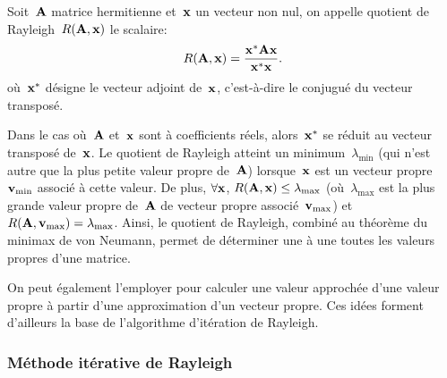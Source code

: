 \begin{definition}
Soit~$\MM{A}$ matrice hermitienne et~$\VV{x}$ un vecteur non nul, on appelle quotient de Rayleigh~$R(\MM{A},\VV{x})$ le scalaire:
\begin{equation}
  R(\MM{A},\VV{x}) = \frac{\VV{x}^{*} \MM{A} \VV{x}}{\VV{x}^{*}\VV{x}}.
\end{equation}
où~$\VV{x}^{*}$ désigne le vecteur adjoint de~$\VV{x}$, c'est-à-dire le conjugué du vecteur transposé.
\end{definition}

Dans le cas où~$\MM{A}$ et~$\VV{x}$ sont à coefficients réels, alors~$\VV{x}^{*}$ se réduit au vecteur transposé de~$\VV{x}$.
\medskipvm
Le quotient de Rayleigh atteint un minimum~$\lambda_{\min}$ (qui n'est autre que la plus petite valeur propre de~$\MM{A}$) lorsque~$\VV{x}$ est un vecteur propre~$\VV{v}_{\min}$ associé à cette valeur.
\medskipvm
De plus, $\forall \VV{x}$, $R(\MM{A}, \VV{x}) \leq \lambda_{\max}$ (où~$\lambda_{\max}$ est la plus grande valeur propre de~$\MM{A}$ de vecteur propre associé~$\VV{v}_{\max}$) et~$R(\MM{A}, \VV{v}_{\max}) = \lambda_{\max}$. Ainsi, le quotient de Rayleigh, combiné au théorème du minimax de von Neumann,
permet de déterminer une à une toutes les valeurs propres d'une matrice.

On peut également l'employer pour calculer une valeur approchée d'une valeur propre à partir d'une approximation d'un vecteur propre. Ces idées forment d'ailleurs la base de l'algorithme d'itération de Rayleigh.

\medskip
\subsubsection{Méthode itérative de Rayleigh}

